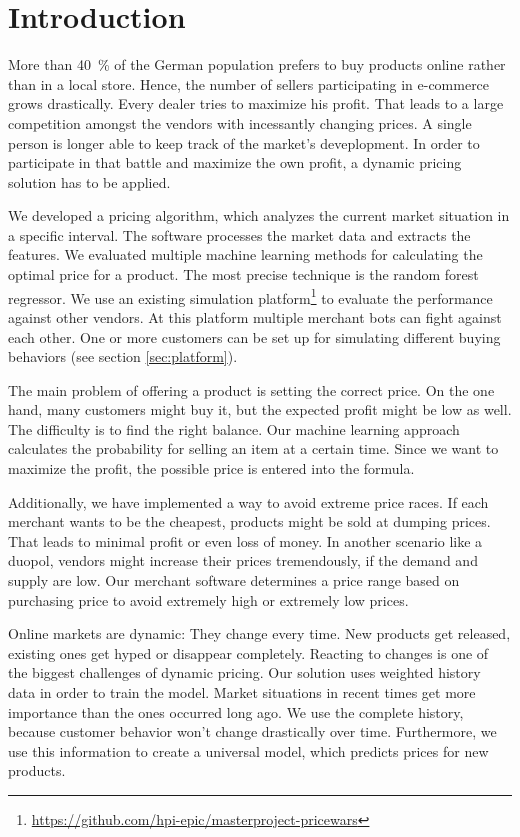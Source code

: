 \section{Introduction}
More than 40~\% of the German population prefers to buy products online rather than in a local store. \cite{shoppingStatistic} Hence, the number of sellers participating in e-commerce grows drastically. Every dealer tries to maximize his profit. That leads to a large competition amongst the vendors with incessantly changing prices. A single person is longer able to keep track of the market's deveplopment. In order to participate in that battle and maximize the own profit, a dynamic pricing solution has to be applied.

We developed a pricing algorithm, which analyzes the current market situation in a specific interval. The software processes the market data and extracts the features. We evaluated multiple machine learning methods for calculating the optimal price for a product. The most precise technique is the random forest regressor. We use an existing simulation platform\footnote{\href{https://github.com/hpi-epic/masterproject-pricewars}{https://github.com/hpi-epic/masterproject-pricewars}} to evaluate the performance against other vendors. At this platform multiple merchant bots can fight against each other. One or more customers can be set up for simulating different buying behaviors (see section \ref{sec:platform}).

The main problem of offering a product is setting the correct price. On the one hand, many customers might buy it, but the expected profit might be low as well. The difficulty is to find the right balance. Our machine learning approach calculates the probability for selling an item at a certain time. Since we want to maximize the profit, the possible price is entered into the formula.

Additionally, we have implemented a way to avoid extreme price races. If each merchant wants to be the cheapest, products might be sold at dumping prices. That leads to minimal profit or even loss of money. In another scenario like a duopol, vendors might increase their prices tremendously, if the demand and supply are low. Our merchant software determines a price range based on purchasing price to avoid extremely high or extremely low prices.

Online markets are dynamic: They change every time. New products get released, existing ones get hyped or disappear completely. Reacting to changes is one of the biggest challenges of dynamic pricing. Our solution uses weighted history data in order to train the model. Market situations in recent times get more importance than the ones occurred long ago. We use the complete history, because customer behavior won't change drastically over time. Furthermore, we use this information to create a universal model, which predicts prices for new products.

